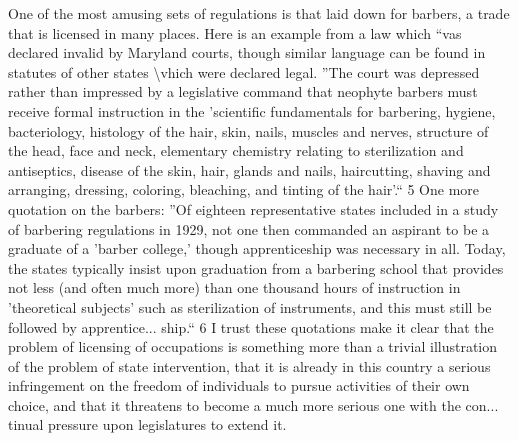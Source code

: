 \documentclass[11pt,openany]{book}
\begin{document}
One of the most amusing sets of regulations is that laid down for barbers, a trade that is licensed in many places. Here is an example from a law which ``vas declared invalid by Maryland courts, though similar language can be found in statutes of other states \textbackslash{}vhich were declared legal. ''The court was depressed rather than impressed by a legislative command that neophyte barbers must receive formal instruction in the 'scientific fundamentals for barbering, hygiene, bacteriology, histology of the hair, skin, nails, muscles and nerves, structure of the head, face and neck, elementary chemistry relating to sterilization and antiseptics, disease of the skin, hair, glands and nails, haircutting, shaving and arranging, dressing, coloring, bleaching, and tinting of the hair'.`` 5 One more quotation on the barbers: ''Of eighteen representative states included in a study of barbering regulations in 1929, not one then commanded an aspirant to be a graduate of a 'barber college,' though apprenticeship was necessary in all. Today, the states typically insist upon graduation from a barbering school that provides not less (and often much more) than one thousand hours of instruction in 'theoretical subjects' such as sterilization of instruments, and this must still be followed by apprentice... ship.`` 6 I trust these quotations make it clear that the problem of licensing of occupations is something more than a trivial illustration of the problem of state intervention, that it is already in this country a serious infringement on the freedom of individuals to pursue activities of their own choice, and that it threatens to become a much more serious one with the con... tinual pressure upon legislatures to extend it.
\end{document}
